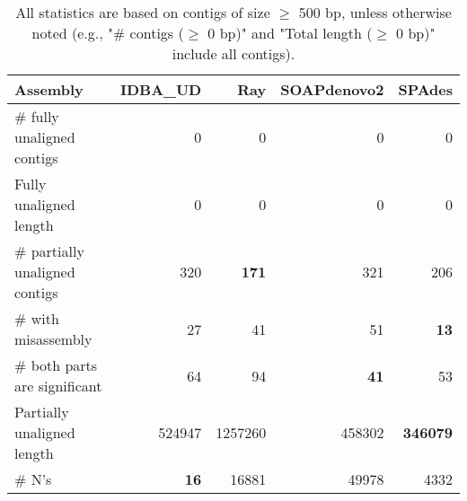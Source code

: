 \documentclass[12pt,a4paper]{article}
\begin{document}
\begin{table}[ht]
\begin{center}
\caption{All statistics are based on contigs of size $\geq$ 500 bp, unless otherwise noted (e.g., "\# contigs ($\geq$ 0 bp)" and "Total length ($\geq$ 0 bp)" include all contigs).}
\begin{tabular}{|l*{4}{|r}|}
\hline
Assembly & IDBA\_UD & Ray & SOAPdenovo2 & SPAdes \\ \hline
\# fully unaligned contigs & 0 & 0 & 0 & 0 \\ \hline
Fully unaligned length & 0 & 0 & 0 & 0 \\ \hline
\# partially unaligned contigs & 320 & {\bf 171} & 321 & 206 \\ \hline
\hspace{5mm}\# with misassembly & 27 & 41 & 51 & {\bf 13} \\ \hline
\hspace{5mm}\# both parts are significant & 64 & 94 & {\bf 41} & 53 \\ \hline
Partially unaligned length & 524947 & 1257260 & 458302 & {\bf 346079} \\ \hline
\# N's & {\bf 16} & 16881 & 49978 & 4332 \\ \hline
\end{tabular}
\end{center}
\end{table}
\end{document}
